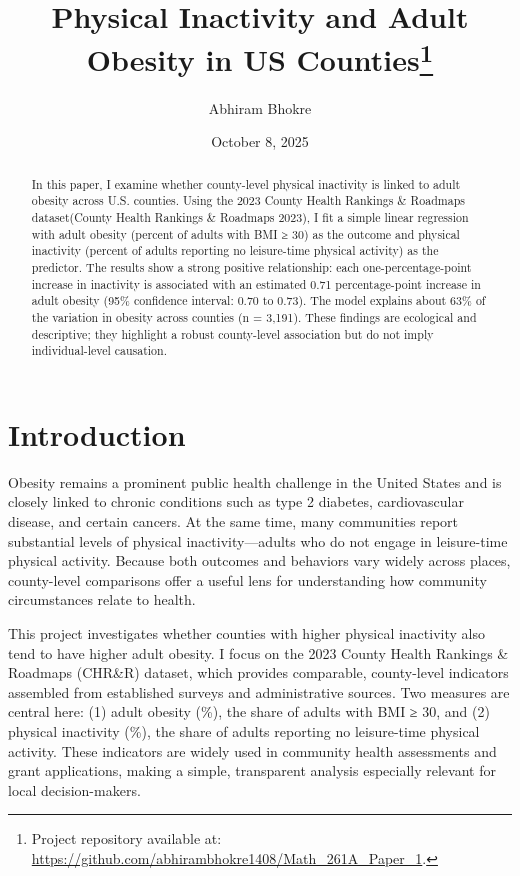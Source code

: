 \documentclass[
  letterpaper,
  DIV=11,
  numbers=noendperiod]{scrartcl}
\title{Physical Inactivity and Adult Obesity in US
Counties\thanks{Project repository available at:
\url{https://github.com/abhirambhokre1408/Math_261A_Paper_1}.}}
\author{Abhiram Bhokre}
\date{October 8, 2025}
\begin{document}
\maketitle
\begin{abstract}
In this paper, I examine whether county-level physical inactivity is
linked to adult obesity across U.S. counties. Using the 2023 County
Health Rankings \& Roadmaps dataset(County Health Rankings \& Roadmaps
2023), I fit a simple linear regression with adult obesity (percent of
adults with BMI ≥ 30) as the outcome and physical inactivity (percent of
adults reporting no leisure-time physical activity) as the predictor.
The results show a strong positive relationship: each
one-percentage-point increase in inactivity is associated with an
estimated 0.71 percentage-point increase in adult obesity (95\%
confidence interval: 0.70 to 0.73). The model explains about 63\% of the
variation in obesity across counties (n = 3,191). These findings are
ecological and descriptive; they highlight a robust county-level
association but do not imply individual-level causation.
\end{abstract}


\section{Introduction}\label{introduction}

Obesity remains a prominent public health challenge in the United States
and is closely linked to chronic conditions such as type 2 diabetes,
cardiovascular disease, and certain cancers. At the same time, many
communities report substantial levels of physical inactivity---adults
who do not engage in leisure-time physical activity. Because both
outcomes and behaviors vary widely across places, county-level
comparisons offer a useful lens for understanding how community
circumstances relate to health.

This project investigates whether counties with higher physical
inactivity also tend to have higher adult obesity. I focus on the 2023
County Health Rankings \& Roadmaps (CHR\&R) dataset, which provides
comparable, county-level indicators assembled from established surveys
and administrative sources. Two measures are central here: (1) adult
obesity (\%), the share of adults with BMI ≥ 30, and (2) physical
inactivity (\%), the share of adults reporting no leisure-time physical
activity. These indicators are widely used in community health
assessments and grant applications, making a simple, transparent
analysis especially relevant for local decision-makers.
\end{document}
